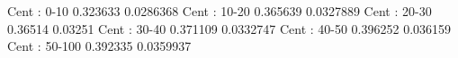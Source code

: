 Cent : 0-10
0.323633 0.0286368
Cent : 10-20
0.365639 0.0327889
Cent : 20-30
0.36514 0.03251
Cent : 30-40
0.371109 0.0332747
Cent : 40-50
0.396252 0.036159
Cent : 50-100
0.392335 0.0359937
